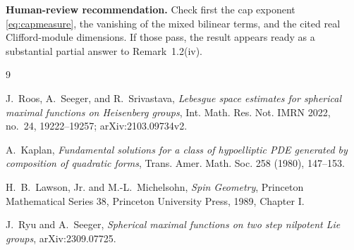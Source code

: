 \documentclass[11pt]{article}
\begin{document}
\medskip
\noindent\textbf{Human-review recommendation.}
Check first the cap exponent \eqref{eq:capmeasure}, the vanishing of the mixed
bilinear terms, and the cited real Clifford-module dimensions.  If those pass,
the result appears ready as a substantial partial answer to Remark~1.2(iv).

\begin{thebibliography}{9}

J.~Roos, A.~Seeger, and R.~Srivastava,
\emph{Lebesgue space estimates for spherical maximal functions on Heisenberg
groups}, Int. Math. Res. Not. IMRN 2022, no.~24, 19222--19257;
arXiv:2103.09734v2.

A.~Kaplan,
\emph{Fundamental solutions for a class of hypoelliptic PDE generated by
composition of quadratic forms}, Trans. Amer. Math. Soc. 258 (1980), 147--153.

H.~B.~Lawson, Jr. and M.-L.~Michelsohn,
\emph{Spin Geometry}, Princeton Mathematical Series 38, Princeton University
Press, 1989, Chapter I.

J.~Ryu and A.~Seeger,
\emph{Spherical maximal functions on two step nilpotent Lie groups},
arXiv:2309.07725.

\end{thebibliography}
\end{document}
